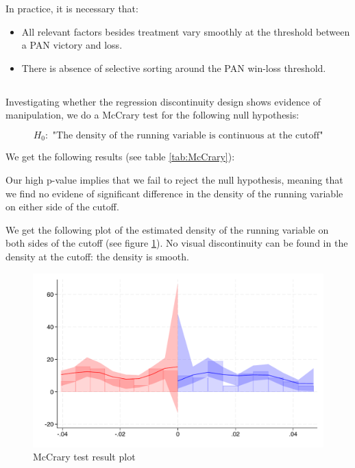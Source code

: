 \documentclass{article}
\begin{document}
In practice, it is necessary that:
\begin{itemize}   
    \item All relevant factors besides treatment vary smoothly at the threshold between a PAN victory and loss.
    \item There is absence of selective sorting around the PAN win-loss threshold.
\end{itemize}



\subsection{}

Investigating whether the regression discontinuity design shows evidence of manipulation, we do a McCrary test for the following null hypothesis:

\[H_0: \text{ "The density of the running variable is continuous at the cutoff"}\]

We get the following results (see table \ref{tab:McCrary}):


Our high p-value implies that we fail to reject the null hypothesis, meaning that we find no evidene of significant difference in the density of the running variable on either side of the cutoff.

We get the following plot of the estimated density of the running variable on both sides of the cutoff (see figure \ref{fig:McCrary}). No visual discontinuity can be found in the density at the cutoff: the density is smooth. 

\begin{figure}[H]
    \centering
    \includegraphics[width=\textwidth]{../outputs/mccrary_plot.pdf}
    \caption{McCrary test result plot}
    \label{fig:McCrary}
\end{figure}
\end{document}
